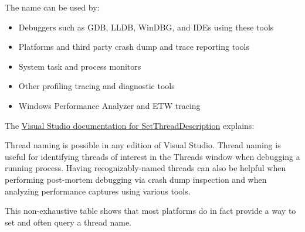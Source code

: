 \documentclass{wg21}
\begin{document}
The name can be used by:
\begin{itemize}
    \item Debuggers such as GDB, LLDB, WinDBG, and IDEs using these tools
    \item Platforms and third party crash dump and trace reporting tools
    \item System task and process monitors
    \item Other profiling tracing and diagnostic tools
    \item Windows Performance Analyzer and ETW tracing
\end{itemize} 

The \href{https://docs.microsoft.com/en-us/visualstudio/debugger/how-to-set-a-thread-name-in-native-code?view=vs-2019}{Visual Studio documentation for SetThreadDescription} explains:

\begin{quoteblock}
Thread naming is possible in any edition of Visual Studio. Thread naming is useful for identifying threads of interest in the Threads window when debugging a running process. Having recognizably-named threads can also be helpful when performing post-mortem debugging via crash dump inspection and when analyzing performance captures using various tools.
\end{quoteblock}

This non-exhaustive table shows that most platforms do in fact provide a way to set and often query a thread name.
\end{document}
